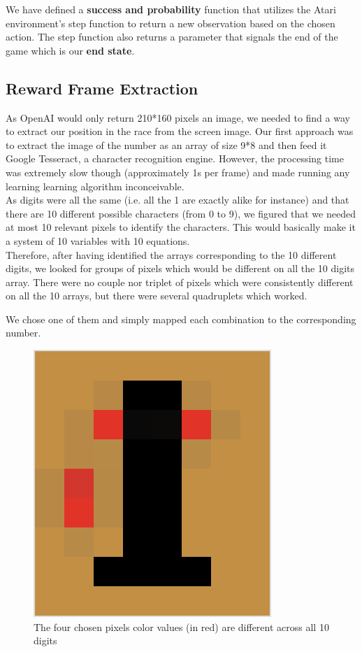 \documentclass[10pt,twocolumn,letterpaper]{article}
\begin{document}
We have defined a \textbf{success and probability} function that utilizes the Atari environment's step function to return a new observation based on the chosen action. The step function also returns a parameter that signals the end of the game which is our \textbf{end state}.



\subsection{Reward Frame Extraction}

As OpenAI would only return 210*160 pixels an image, we needed to find a way to extract our position in the race from the screen image.
Our first approach was to extract the image of the number as an array of size 9*8 and then feed it Google Tesseract, a character recognition engine. However, the processing time was extremely slow though (approximately 1s per frame) and made running any learning learning algorithm inconceivable.\\

As digits were all the same (i.e. all the 1 are exactly alike for instance) and that there are 10 different possible characters (from 0 to 9), we figured that we needed at most 10 relevant pixels to identify the characters. This would basically make it a system of 10 variables with 10 equations.\\

Therefore, after having identified the arrays corresponding to the 10 different digits, we looked for groups of pixels which would be different on all the 10 digits array. There were no couple nor triplet of pixels which were consistently different on all the 10 arrays, but there were several quadruplets which worked. 

We chose one of them and simply mapped each combination to the corresponding number.

\begin{figure}[h]
\centering
\includegraphics[width=0.6\linewidth]{RelevantPix.png}
\caption{The four chosen pixels color values (in red) are different across all 10 digits}
\end{figure}
\end{document}
